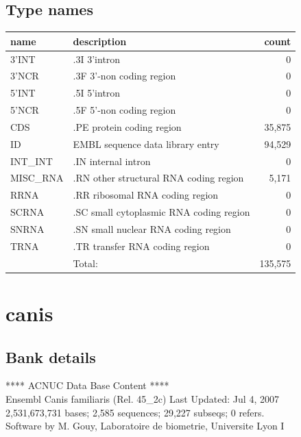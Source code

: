 \documentclass{article}
\begin{document}
\begin{Schunk}
\subsection{Type names}
\noindent\begin{tabular}{llr}
\hline \hline
name & description & count \\
\hline
3'INT  &  .3I 3'intron  &  0 \\
3'NCR  &  .3F  3'-non coding region  &  0 \\
5'INT  &  .5I 5'intron  &  0 \\
5'NCR  &  .5F  5'-non coding region  &  0 \\
CDS  &  .PE protein coding region  &  35,875 \\
ID  &  EMBL sequence data library entry  &  94,529 \\
INT\_INT  &  .IN  internal intron  &  0 \\
MISC\_RNA  &  .RN other structural RNA coding region  &  5,171 \\
RRNA  &  .RR ribosomal RNA coding region  &  0 \\
SCRNA  &  .SC small cytoplasmic RNA coding region  &  0 \\
SNRNA  &  .SN small nuclear RNA coding region  &  0 \\
TRNA  &  .TR transfer RNA coding region  &  0 \\
\hline
 & Total: & 135,575 \\
\hline \hline
\end{tabular}

\section{ canis }
\subsection{Bank details}
             ****     ACNUC Data Base Content      ****                         \\
       Ensembl Canis familiaris  (Rel. 45\_2c) Last Updated: Jul  4, 2007\\
2,531,673,731 bases; 2,585 sequences; 29,227 subseqs; 0 refers.\\
Software by M. Gouy, Laboratoire de biometrie, Universite Lyon I 


\end{Schunk}
\end{document}
